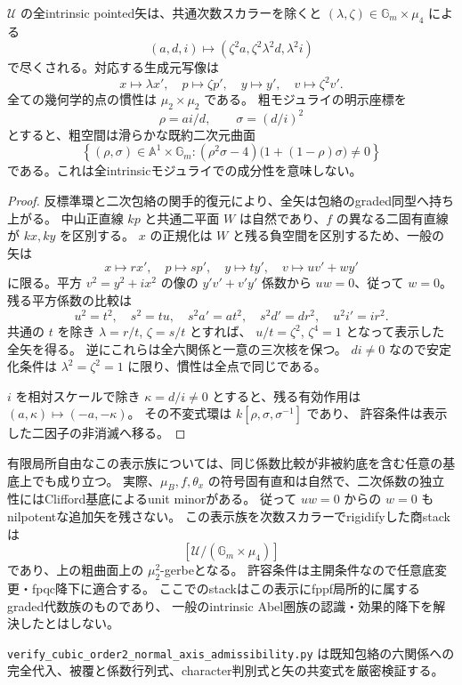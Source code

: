 \begin{theorem}[正常形の全幾何学的矢と一様慣性]
\label{thm:h3-order2-normal-axis-full-arrows}
$\mathcal U$ の全intrinsic pointed矢は、共通次数スカラーを除くと
$(\lambda,\zeta)\in\mathbb G_m\times\mu_4$ による
\[
 (a,d,i)\longmapsto(\zeta^2a,\zeta^2\lambda^2d,\lambda^2i)
\]
で尽くされる。対応する生成元写像は
\[
 x\mapsto\lambda x',\quad p\mapsto\zeta p',\quad
 y\mapsto y',\quad v\mapsto\zeta^2v'.
\]
全ての幾何学的点の慣性は $\mu_2\times\mu_2$ である。
粗モジュライの明示座標を
\[
 \rho=ai/d,\qquad\sigma=(d/i)^2
\]
とすると、粗空間は滑らかな既約二次元曲面
\[
 \left\{(\rho,\sigma)\in\mathbb A^1\times\mathbb G_m:
 (\rho^2\sigma-4)\bigl(1+(1-\rho)\sigma\bigr)\ne0\right\}
\]
である。これは全intrinsicモジュライでの成分性を意味しない。
\end{theorem}
\begin{proof}
反標準環と二次包絡の関手的復元により、全矢は包絡のgraded同型へ持ち上がる。
中山正直線 $kp$ と共通二平面 $W$ は自然であり、$f$ の異なる二固有直線が $kx,ky$ を区別する。
$x$ の正規化は $W$ と残る負空間を区別するため、一般の矢は
\[
 x\mapsto r x',\quad p\mapsto s p',\quad y\mapsto t y',\quad
 v\mapsto u v'+w y'
\]
に限る。平方 $v^2=y^2+i x^2$ の像の $y'v'+v'y'$ 係数から $uw=0$、従って $w=0$。
残る平方係数の比較は
\[
 u^2=t^2,\quad s^2=tu,\quad
 s^2a'=at^2,\quad s^2d'=dr^2,\quad u^2i'=ir^2.
\]
共通の $t$ を除き $\lambda=r/t$, $\zeta=s/t$ とすれば、
$u/t=\zeta^2$, $\zeta^4=1$ となって表示した全矢を得る。
逆にこれらは全六関係と一意の三次核を保つ。
$di\ne0$ なので安定化条件は $\lambda^2=\zeta^2=1$ に限り、慣性は全点で同じである。

$i$ を相対スケールで除き $\kappa=d/i\ne0$ とすると、残る有効作用は
$(a,\kappa)\mapsto(-a,-\kappa)$。
その不変式環は $k[\rho,\sigma,\sigma^{-1}]$ であり、
許容条件は表示した二因子の非消滅へ移る。
\end{proof}
有限局所自由なこの表示族については、同じ係数比較が非被約底を含む任意の基底上でも成り立つ。
実際、$\mu_B,f,\theta_x$ の符号固有直和は自然で、二次係数の独立性にはClifford基底によるunit minorがある。
従って $uw=0$ からの $w=0$ もnilpotentな追加矢を残さない。
この表示族を次数スカラーでrigidifyした商stackは
\[
 [\mathcal U/(\mathbb G_m\times\mu_4)]
\]
であり、上の粗曲面上の $\mu_2^2$-gerbeとなる。
許容条件は主開条件なので任意底変更・fpqc降下に適合する。
ここでのstackはこの表示にfppf局所的に属するgraded代数族のものであり、
一般のintrinsic Abel圏族の認識・効果的降下を解決したとはしない。

\texttt{verify\_\allowbreak{}cubic\_\allowbreak{}order2\_\allowbreak{}normal\_\allowbreak{}axis\_\allowbreak{}admissibility.py}
は既知包絡の六関係への完全代入、被覆と係数行列式、character判別式と矢の共変式を厳密検証する。

